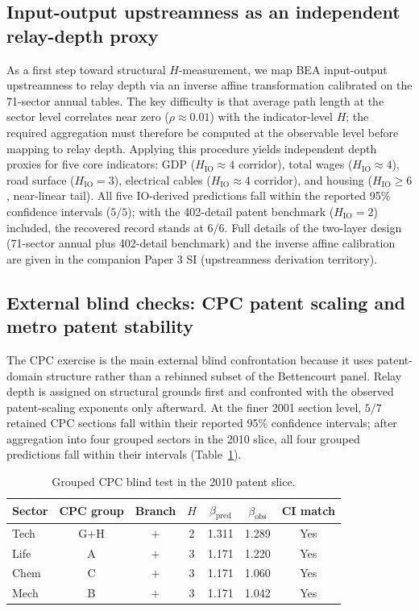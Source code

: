 \subsection{Input-output upstreamness as an independent relay-depth proxy}\label{subsec:input_output_upstreamness}
\begingroup\sloppy
As a first step toward structural \(H\)-measurement, we map BEA
input-output upstreamness to relay depth via an inverse affine
transformation calibrated on the 71-sector annual tables.
The key difficulty is that average path length at the sector level
correlates near zero (\(\rho\approx 0.01\)) with the indicator-level
\(H\); the required aggregation must therefore be computed at the
observable level before mapping to relay depth.
Applying this procedure yields independent depth proxies for five
core indicators: GDP (\(H_{\mathrm{IO}}\approx 4\) corridor),
total wages (\(H_{\mathrm{IO}}\approx 4\)), road surface
(\(H_{\mathrm{IO}}=3\)), electrical cables
(\(H_{\mathrm{IO}}\approx 4\) corridor), and housing
(\(H_{\mathrm{IO}}\ge 6\), near-linear tail).
All five IO-derived predictions fall within the reported 95\% confidence
intervals (\(5/5\)); with the 402-detail patent benchmark
(\(H_{\mathrm{IO}}=2\)) included, the recovered record stands at \(6/6\).
Full details of the two-layer design (71-sector annual
plus 402-detail benchmark) and the inverse affine calibration are
given in the companion Paper 3 SI (upstreamness derivation territory).
\endgroup

\subsection{External blind checks: CPC patent scaling and metro patent stability}\label{subsec:patent_anchor}
The CPC exercise is the main external blind confrontation because it uses
patent-domain structure rather than a rebinned subset of the Bettencourt panel.
Relay depth is assigned on structural grounds first and confronted with the
observed patent-scaling exponents only afterward. At the finer 2001 section
level, $5/7$ retained CPC sections fall within their reported 95\% confidence
intervals; after aggregation into four grouped sectors in the 2010 slice, all
four grouped predictions fall within their intervals (Table~\ref{tab:cpc_grouped}).

\begin{table}[t]
\caption{Grouped CPC blind test in the 2010 patent slice.}
\label{tab:cpc_grouped}
\centering
\begin{tabular}{lcccccc}
\toprule
Sector & CPC group & Branch & \(H\) & \(\beta_{\mathrm{pred}}\) & \(\beta_{\mathrm{obs}}\) & CI match \\
\midrule
Tech & G+H & \(+\) & 2 & 1.311 & 1.289 & Yes \\
Life & A & \(+\) & 3 & 1.171 & 1.220 & Yes \\
Chem & C & \(+\) & 3 & 1.171 & 1.060 & Yes \\
Mech & B & \(+\) & 3 & 1.171 & 1.042 & Yes \\
\bottomrule
\end{tabular}
\end{table}

